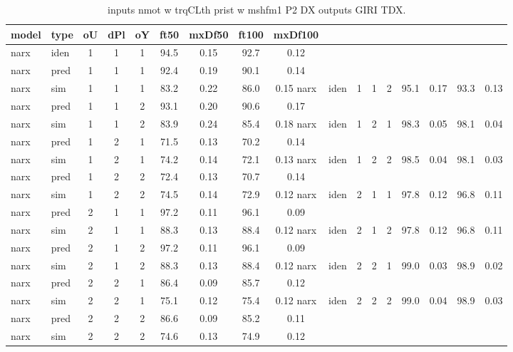 \begin{center} 
\begin{longtable}{ll|ccc|cc|cc} 
\caption[inputs nmot w trqCLth prist w mshfm1 P2 DX   outputs GIRI TDX]{inputs nmot w trqCLth prist w mshfm1 P2 DX   outputs GIRI TDX.} 
\label{tab:inputs_nmot_w_trqCLth_prist_w_mshfm1_P2_DX___outputs_GIRI_TDX} 
\hline 
  model & type & oU & dPl & oY & ft50 & mxDf50 & ft100 & mxDf100 \\ 
 \hline 
narx & iden & 1 & 1 & 1 & 94.5 & 0.15 & 92.7 & 0.12 \\ 
narx & pred & 1 & 1 & 1 & 92.4 & 0.19 & 90.1 & 0.14 \\ 
narx & sim  & 1 & 1 & 1 & 83.2 & 0.22 & 86.0 & 0.15 
 \hline 
narx & iden & 1 & 1 & 2 & 95.1 & 0.17 & 93.3 & 0.13 \\ 
narx & pred & 1 & 1 & 2 & 93.1 & 0.20 & 90.6 & 0.17 \\ 
narx & sim  & 1 & 1 & 2 & 83.9 & 0.24 & 85.4 & 0.18 
 \hline 
narx & iden & 1 & 2 & 1 & 98.3 & 0.05 & 98.1 & 0.04 \\ 
narx & pred & 1 & 2 & 1 & 71.5 & 0.13 & 70.2 & 0.14 \\ 
narx & sim  & 1 & 2 & 1 & 74.2 & 0.14 & 72.1 & 0.13 
 \hline 
narx & iden & 1 & 2 & 2 & 98.5 & 0.04 & 98.1 & 0.03 \\ 
narx & pred & 1 & 2 & 2 & 72.4 & 0.13 & 70.7 & 0.14 \\ 
narx & sim  & 1 & 2 & 2 & 74.5 & 0.14 & 72.9 & 0.12 
 \hline 
narx & iden & 2 & 1 & 1 & 97.8 & 0.12 & 96.8 & 0.11 \\ 
narx & pred & 2 & 1 & 1 & 97.2 & 0.11 & 96.1 & 0.09 \\ 
narx & sim  & 2 & 1 & 1 & 88.3 & 0.13 & 88.4 & 0.12 
 \hline 
narx & iden & 2 & 1 & 2 & 97.8 & 0.12 & 96.8 & 0.11 \\ 
narx & pred & 2 & 1 & 2 & 97.2 & 0.11 & 96.1 & 0.09 \\ 
narx & sim  & 2 & 1 & 2 & 88.3 & 0.13 & 88.4 & 0.12 
 \hline 
narx & iden & 2 & 2 & 1 & 99.0 & 0.03 & 98.9 & 0.02 \\ 
narx & pred & 2 & 2 & 1 & 86.4 & 0.09 & 85.7 & 0.12 \\ 
narx & sim  & 2 & 2 & 1 & 75.1 & 0.12 & 75.4 & 0.12 
 \hline 
narx & iden & 2 & 2 & 2 & 99.0 & 0.04 & 98.9 & 0.03 \\ 
narx & pred & 2 & 2 & 2 & 86.6 & 0.09 & 85.2 & 0.11 \\ 
narx & sim  & 2 & 2 & 2 & 74.6 & 0.13 & 74.9 & 0.12 
 \hline 
\end{longtable} 
\end{center}